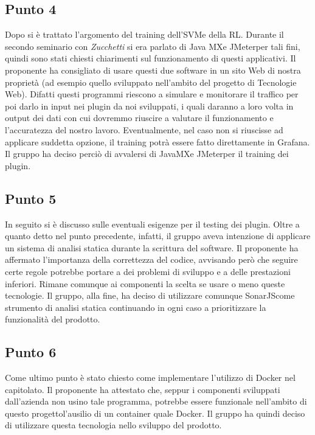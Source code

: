         \subsection{Punto 4}
            Dopo si è trattato l'argomento del training dell'SVM\glosp e della RL\glo. Durante il secondo seminario con \textit{Zucchetti} si era parlato di Java MX\glosp e JMeter\glosp per tali fini, quindi sono stati chiesti chiarimenti sul funzionamento di questi applicativi. Il proponente ha consigliato di usare questi due software in un sito Web di nostra proprietà (ad esempio quello sviluppato nell'ambito del progetto di Tecnologie Web). Difatti questi programmi riescono a simulare e monitorare il traffico per poi darlo in input nei plugin da noi sviluppati, i quali daranno a loro volta in output dei dati con cui dovremmo riuscire a valutare il funzionamento e l'accuratezza del nostro lavoro. Eventualmente, nel caso non si riuscisse ad applicare suddetta opzione, il training potrà essere fatto direttamente in Grafana\glo. Il gruppo ha deciso perciò di avvalersi di JavaMX\glosp e JMeter\glosp per il training dei plugin.
        \subsection{Punto 5}
            In seguito si è discusso sulle eventuali esigenze per il testing dei plugin. Oltre a quanto detto nel punto precedente, infatti, il gruppo aveva intenzione di applicare un sistema di analisi statica durante la scrittura del software. Il proponente ha affermato l'importanza della correttezza del codice, avvisando però che seguire certe regole potrebbe portare a dei problemi di sviluppo e a delle prestazioni inferiori. Rimane comunque ai componenti la scelta se usare o meno queste tecnologie. Il gruppo, alla fine, ha deciso di utilizzare comunque SonarJS\glosp come strumento di analisi statica continuando in ogni caso a prioritizzare la funzionalità del prodotto\glo.
        \subsection{Punto 6}
            Come ultimo punto è stato chiesto come implementare l'utilizzo di Docker nel capitolato\glo. Il proponente ha attestato che, seppur i componenti sviluppati dall'azienda non usino tale programma, potrebbe essere funzionale nell'ambito di questo progetto\glosp l'ausilio di un container quale Docker. Il gruppo ha quindi deciso di utilizzare questa tecnologia nello sviluppo del prodotto\glo.